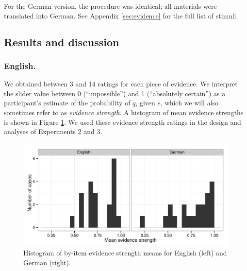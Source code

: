 \documentclass[11pt]{article}
\newcommand{\figref}[1]{Figure \ref{#1}}
\newcommand{\appref}[1]{Appendix \ref{#1}}
\begin{document}
For the German version, the procedure was identical; all materials were translated into German. See \appref{sec:evidence} for the full list of stimuli.

\subsection{Results and discussion}

\subsubsection{English.}
We obtained between 3 and 14 ratings for each piece of evidence. We interpret the slider value between 0 (``impossible'') and 1 (``absolutely certain'') as a participant's estimate of the probability of $q$, given $e$, which we will also sometimes refer to as  \emph{evidence strength}. A histogram of mean evidence strengths is shown in \figref{fig:evidencestrength}.  We used these evidence strength ratings in the design and analyses of Experiments 2 and 3.

\begin{figure}
\centering
\includegraphics[width=.9\textwidth]{pics/evidencestrength-histograms}
\caption{Histogram of by-item evidence strength means  for English (left) and German (right).}
\label{fig:evidencestrength}
\end{figure}
\end{document}
